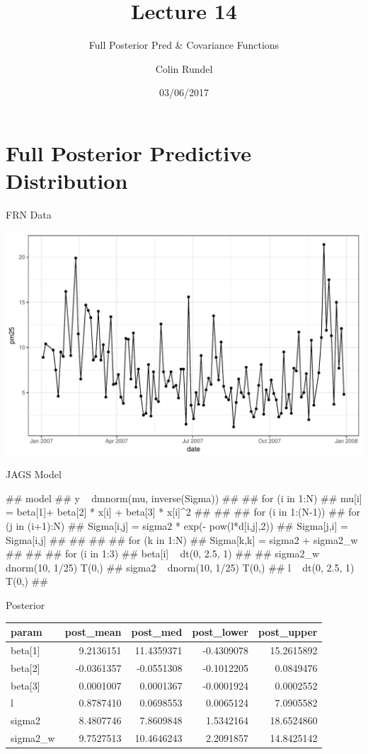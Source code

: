 \documentclass[11pt,ignorenonframetext,]{beamer}
\title{Lecture 14}
\subtitle{Full Posterior Pred \& Covariance Functions}
\author{Colin Rundel}
\date{03/06/2017}
\let\oldShaded\Shaded
\let\endoldShaded\endShaded
\let\oldverbatim\verbatim
\let\endoldverbatim\endverbatim
\renewenvironment{verbatim}{\footnotesize\begin{spacing}{0.9}\oldverbatim}{\endoldverbatim\end{spacing}}
\newcommand{\scriptoutput}{
  \renewenvironment{Shaded}{\scriptsize\begin{spacing}{0.9}\oldShaded}{\endoldShaded\end{spacing}}
  \renewenvironment{verbatim}{\scriptsize\begin{spacing}{0.9}\oldverbatim}{\endoldverbatim\end{spacing}}
}
\begin{document}
\frame{\titlepage}

\section{Full Posterior Predictive
Distribution}\label{full-posterior-predictive-distribution}

\begin{frame}{FRN Data}

\includegraphics{Lec14_files/figure-beamer/unnamed-chunk-1-1.pdf}

\end{frame}

\begin{frame}[fragile]{JAGS Model}

\scriptoutput

\begin{verbatim}
## model{
##   y ~ dmnorm(mu, inverse(Sigma))
## 
##   for (i in 1:N) {
##     mu[i] = beta[1]+ beta[2] * x[i] + beta[3] * x[i]^2
##   }
##   
##   for (i in 1:(N-1)) {
##     for (j in (i+1):N) {
##       Sigma[i,j] = sigma2 * exp(- pow(l*d[i,j],2))
##       Sigma[j,i] = Sigma[i,j]
##     }
##   }
## 
##   for (k in 1:N) {
##     Sigma[k,k] = sigma2 + sigma2_w
##   }
## 
##   for (i in 1:3) {
##     beta[i] ~ dt(0, 2.5, 1)
##   }
##   sigma2_w ~ dnorm(10, 1/25) T(0,)
##   sigma2   ~ dnorm(10, 1/25) T(0,)
##   l        ~ dt(0, 2.5, 1) T(0,) 
## }
\end{verbatim}

\end{frame}

\begin{frame}{Posterior}

\begin{longtable}[]{@{}lrrrr@{}}
\toprule
param & post\_mean & post\_med & post\_lower &
post\_upper\tabularnewline
\midrule
\endhead
beta{[}1{]} & 9.2136151 & 11.4359371 & -0.4309078 &
15.2615892\tabularnewline
beta{[}2{]} & -0.0361357 & -0.0551308 & -0.1012205 &
0.0849476\tabularnewline
beta{[}3{]} & 0.0001007 & 0.0001367 & -0.0001924 &
0.0002552\tabularnewline
l & 0.8787410 & 0.0698553 & 0.0065124 & 7.0905582\tabularnewline
sigma2 & 8.4807746 & 7.8609848 & 1.5342164 & 18.6524860\tabularnewline
sigma2\_w & 9.7527513 & 10.4646243 & 2.2091857 &
14.8425142\tabularnewline
\bottomrule
\end{longtable}

\end{frame}
\end{document}
